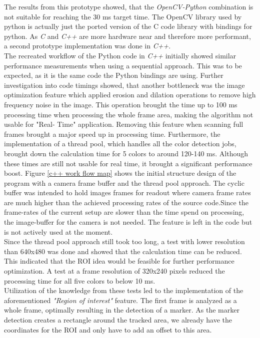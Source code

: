 The results from this prototype showed, that the \textit{OpenCV-Python} combination is not suitable for reaching the 30 ms target time. The OpenCV library used by python is actually just the ported version of the C code library with bindings for python. As \textit{C} and \textit{C++} are more hardware near and therefore more performant, a second prototype implementation was done in \textit{C++}.
\\The recreated workflow of the Python code in\textit{ C++} initially showed similar performance measurements when using a sequential approach. This was to be expected, as it is the same code the Python bindings are using. Further investigation into code timings showed, that another bottleneck was the image optimization feature which applied erosion and dilation operations to remove high frequency noise in the image. This operation brought the time up to 100 ms processing time when processing the whole frame area, making the algorithm  not usable for "Real- Time" application. Removing this feature when scanning full frames brought a major speed up in processing time. 
Furthermore, the implementation of a thread pool, which handles all the color detection jobs, brought down the calculation time for 5 colors to around 120-140 ms. Although these times are still not usable for real time, it brought a significant performance boost. Figure \ref{c++ work flow map} shows the initial structure design of the program with a camera frame buffer and the thread pool approach. The cyclic buffer was intended to hold images frames for readout where camera frame rates are much higher than the achieved processing rates of the source code.Since the frame-rates of the current setup are slower than the time spend on processing, the image-buffer for the camera is not needed. The feature is left in the code but is not actively used at the moment.\\
Since the thread pool approach still took too long, a test with lower resolution than 640x480 was done and showed that the calculation time can be reduced. This indicated that the ROI idea would be feasible for further performance optimization. A test at a frame resolution of 320x240 pixels reduced the processing time for all five colors to below 10 ms.\\Utilization of the knowledge from these tests led to the implementation of the aforementioned\textit{ "Region of interest"} feature.
The first frame is analyzed as a whole frame, optimally resulting in the detection of a marker. As the marker detection creates a rectangle around the tracked area, we already have the coordinates for the ROI and only have to add an offset to this area.
